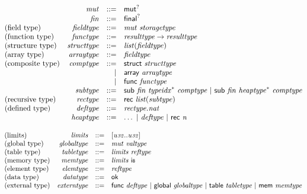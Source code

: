 \vspace{1ex}

$$
\begin{array}{@{}lrrl@{}l@{}}
& {\mathit{mut}} &::=& {\mathsf{mut}^?} \\
& {\mathit{fin}} &::=& {\mathsf{final}^?} \\
\mbox{(field type)} & {\mathit{fieldtype}} &::=& {\mathit{mut}}~{\mathit{storagetype}} \\
\mbox{(function type)} & {\mathit{functype}} &::=& {\mathit{resulttype}} \rightarrow {\mathit{resulttype}} \\
\mbox{(structure type)} & {\mathit{structtype}} &::=& {\mathit{list}}({\mathit{fieldtype}}) \\
\mbox{(array type)} & {\mathit{arraytype}} &::=& {\mathit{fieldtype}} \\
\mbox{(composite type)} & {\mathit{comptype}} &::=& \mathsf{struct}~{\mathit{structtype}} \\ &&|&
\mathsf{array}~{\mathit{arraytype}} \\ &&|&
\mathsf{func}~{\mathit{functype}} \\
& {\mathit{subtype}} &::=& \mathsf{sub}~{\mathit{fin}}~{{\mathit{typeidx}}^\ast}~{\mathit{comptype}} ~|~ \mathsf{sub}~{\mathit{fin}}~{{\mathit{heaptype}}^\ast}~{\mathit{comptype}} \\
\mbox{(recursive type)} & {\mathit{rectype}} &::=& \mathsf{rec}~{\mathit{list}}({\mathit{subtype}}) \\
\mbox{(defined type)} & {\mathit{deftype}} &::=& {\mathit{rectype}} . {\mathit{nat}} \\
& {\mathit{heaptype}} &::=& \dots ~|~ {\mathit{deftype}} ~|~ \mathsf{rec}~{\mathit{n}} \\
\end{array}
$$

\vspace{1ex}

$$
\begin{array}{@{}lrrl@{}l@{}}
\mbox{(limits)} & {\mathit{limits}} &::=& {}[{\mathit{u{\scriptstyle32}}} .. {\mathit{u{\scriptstyle32}}}] \\
\mbox{(global type)} & {\mathit{globaltype}} &::=& {\mathit{mut}}~{\mathit{valtype}} \\
\mbox{(table type)} & {\mathit{tabletype}} &::=& {\mathit{limits}}~{\mathit{reftype}} \\
\mbox{(memory type)} & {\mathit{memtype}} &::=& {\mathit{limits}}~\mathsf{i{\scriptstyle8}} \\
\mbox{(element type)} & {\mathit{elemtype}} &::=& {\mathit{reftype}} \\
\mbox{(data type)} & {\mathit{datatype}} &::=& \mathsf{ok} \\
\mbox{(external type)} & {\mathit{externtype}} &::=& \mathsf{func}~{\mathit{deftype}} ~|~ \mathsf{global}~{\mathit{globaltype}} ~|~ \mathsf{table}~{\mathit{tabletype}} ~|~ \mathsf{mem}~{\mathit{memtype}} \\
\end{array}
$$

